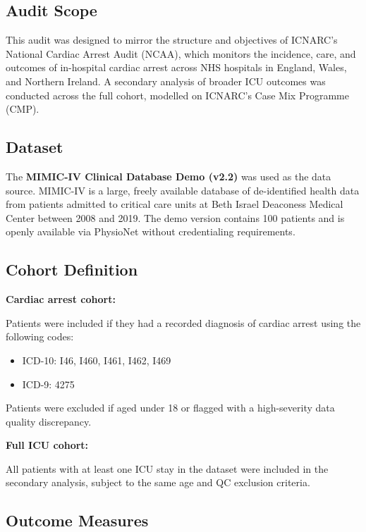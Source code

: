 \documentclass[
]{article}
\providecommand{\tightlist}{%
  \setlength{\itemsep}{0pt}\setlength{\parskip}{0pt}}
\begin{document}
\subsection{Audit Scope}\label{audit-scope}

This audit was designed to mirror the structure and objectives of
ICNARC's National Cardiac Arrest Audit (NCAA), which monitors the
incidence, care, and outcomes of in-hospital cardiac arrest across NHS
hospitals in England, Wales, and Northern Ireland. A secondary analysis
of broader ICU outcomes was conducted across the full cohort, modelled
on ICNARC's Case Mix Programme (CMP).

\subsection{Dataset}\label{dataset}

The \textbf{MIMIC-IV Clinical Database Demo (v2.2)} was used as the data
source. MIMIC-IV is a large, freely available database of de-identified
health data from patients admitted to critical care units at Beth Israel
Deaconess Medical Center between 2008 and 2019. The demo version
contains 100 patients and is openly available via PhysioNet without
credentialing requirements.

\subsection{Cohort Definition}\label{cohort-definition}

\textbf{Cardiac arrest cohort:}

Patients were included if they had a recorded diagnosis of cardiac
arrest using the following codes:

\begin{itemize}
\tightlist
\item
  ICD-10: I46, I460, I461, I462, I469
\item
  ICD-9: 4275
\end{itemize}

Patients were excluded if aged under 18 or flagged with a high-severity
data quality discrepancy.

\textbf{Full ICU cohort:}

All patients with at least one ICU stay in the dataset were included in
the secondary analysis, subject to the same age and QC exclusion
criteria.

\subsection{Outcome Measures}\label{outcome-measures}
\end{document}
